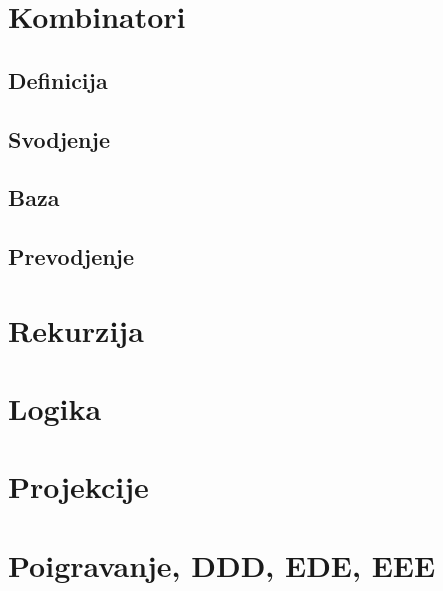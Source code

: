 \documentclass[10pt,a4paper,oneside]{article}
\begin{document}
  \section{Kombinatori}
  \subsection{Definicija}
  \subsection{Svodjenje}
  \subsection{Baza}
  \subsection{Prevodjenje}
  \section{Rekurzija}
  \section{Logika}
  \section{Projekcije}
  \section{Poigravanje, DDD, EDE, EEE}
\end{document}
